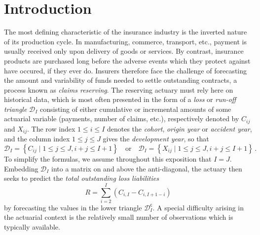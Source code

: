 \documentclass[a4paper]{book}
\begin{document}
\tableofcontents%
\listoftables%
\listoffigures%

\printnomenclature%

\chapter{Introduction} \label{intro}

The most defining characteristic of the insurance industry is the inverted nature of its production cycle. In manufacturing, commerce, transport, etc., payment is usually received only upon delivery of goods or services. By contrast, insurance products are purchased long before the adverse events which they protect against have occured, if they ever do. Insurers therefore face the challenge of forecasting the amount and variability of funds needed to settle outstanding contracts, a process known as \emph{claims reserving}. The reserving actuary must rely here on historical data, which is most often presented in the form of a \emph{loss} or \emph{run-off triangle} $\mathcal{D}_I$ consisting of either cumulative or incremental amounts of some actuarial variable (payments, number of claims, etc.), respectively denoted by $C_{ij}$ and $X_{ij}$. The row index $1 \leq i \leq I$ denotes the \emph{cohort}, \emph{origin year} or \emph {accident year}, and the column index $1 \leq j \leq J$ gives the \emph{development year}, so that
\begin{equation}
  \mathcal{D}_I = \left  \{ C_{ij} \mid 1 \leq j \leq J, i + j \leq I + 1 \right \}
  \quad \text{or} \quad
  \mathcal{D}_I = \left  \{ X_{ij} \mid 1 \leq j \leq J, i + j \leq I + 1 \right \} \,.
\end{equation}
To simplify the formulas, we assume throughout this exposition that $I = J$. Embedding $\mathcal{D}_I$ into a matrix on and above the anti-diagonal, the actuary then seeks to predict the \emph{total outstanding loss liabilities}
\begin{equation}
  R = \sum_{i = 2}^I (C_{i, I} - C_{i, I + 1- i})
\end{equation}
by forecasting the values in the lower triangle $\mathcal{D}^{\mathsf{c}}_I$. A special difficulty arising in the actuarial context is the relatively small number of observations which is typically available.
\end{document}
